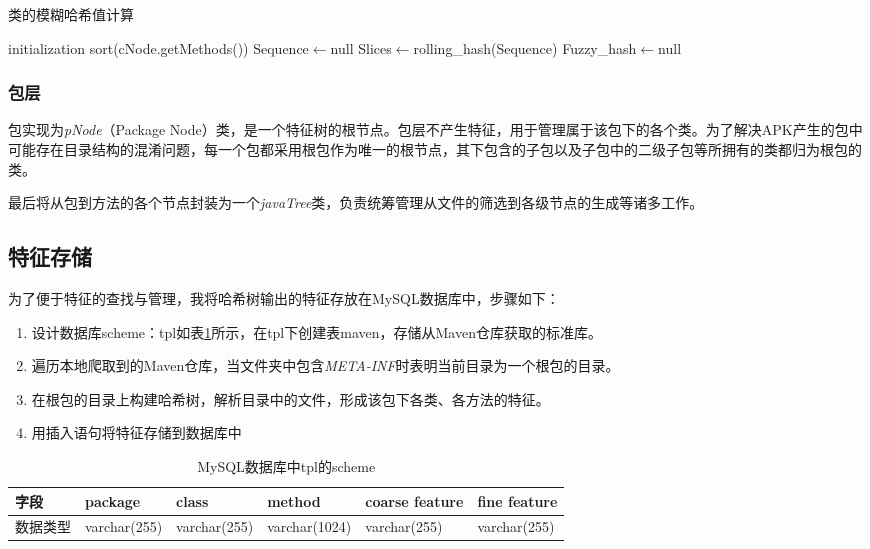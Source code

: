 \begin{algorithm}[htb]
  \caption{类的模糊哈希值计算}
  \label{algo:fuzzyhash}
  \small
  \SetAlgoLined

  initialization\;
  sort(cNode.getMethods())\;
  Sequence$\leftarrow$null\;
  Slices$\leftarrow$rolling\_hash(Sequence)\;
  Fuzzy\_hash$\leftarrow$null\;

\end{algorithm}


\subsubsection{包层}

包实现为\textit{pNode}（Package Node）类，是一个特征树的根节点。包层不产生特征，用于管理属于该包下的各个类。为了解决APK产生的包中可能存在目录结构的混淆问题，每一个包都采用根包作为唯一的根节点，其下包含的子包以及子包中的二级子包等所拥有的类都归为根包的类。

最后将从包到方法的各个节点封装为一个\textit{javaTree}类，负责统筹管理从文件的筛选到各级节点的生成等诸多工作。



\subsection{特征存储}

为了便于特征的查找与管理，我将哈希树输出的特征存放在MySQL数据库中，步骤如下：

\begin{enumerate}
\item{设计数据库scheme：tpl如表\ref{tab:mysql}所示，在tpl下创建表maven，存储从Maven仓库获取的标准库。}
\item{遍历本地爬取到的Maven仓库，当文件夹中包含\textit{META-INF}时表明当前目录为一个根包的目录。}
\item{在根包的目录上构建哈希树，解析目录中的文件，形成该包下各类、各方法的特征。}
\item{用插入语句将特征存储到数据库中}
\end{enumerate}

\begin{table}[!hpt]
  \caption{MySQL数据库中tpl的scheme}
  \label{tab:mysql}
  \centering
  \begin{tabular}{l|lllll} \toprule
    字段 &  package & class & method & coarse feature & fine feature \\ \midrule
    数据类型 & varchar(255) & varchar(255) & varchar(1024) & varchar(255) & varchar(255)  \\  \bottomrule

  \end{tabular}
\end{table}



